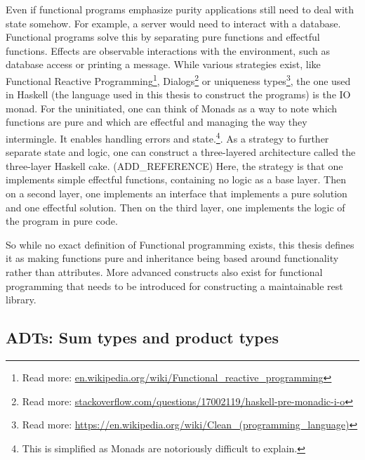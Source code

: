 \begin{description}
Even if functional programs emphasize purity applications still need to deal
        with state somehow. For example, a server would need to interact with a
        database. Functional programs solve this by separating pure functions
        and effectful functions. Effects are observable interactions with the
        environment, such as database access or printing a message.  While
        various strategies exist, like Functional Reactive
        Programming\footnote{Read more:
        \url{en.wikipedia.org/wiki/Functional_reactive_programming}},
        Dialogs\footnote{Read more:
        \url{stackoverflow.com/questions/17002119/haskell-pre-monadic-i-o}} or
        uniqueness types\footnote{Read more:
        \url{https://en.wikipedia.org/wiki/Clean_(programming_language)}}, the
        one used in Haskell (the language used in this thesis to construct the
        programs) is the IO monad. For the uninitiated, one can think of Monads
        as a way to note which functions are pure and which are effectful and
        managing the way they intermingle. It enables handling errors
        and state.\footnote{This is simplified as Monads are notoriously
        difficult to explain.}.  As a strategy to further separate state and logic, one can construct a
three-layered architecture called the three-layer Haskell cake.
(ADD\_REFERENCE) Here,
        the strategy is that one implements simple effectful functions,
        containing no logic as a base layer. Then on a second layer, one
        implements an interface that implements a pure solution and one
        effectful solution. Then on the third layer, one implements the logic of
        the program in pure code.  
\end{description}

So while no exact definition of Functional programming exists, this thesis
defines it as making functions pure and inheritance being based around
functionality rather than attributes. More advanced constructs also exist for
functional programming that needs to be introduced for constructing a
maintainable rest library. 

\subsection{ADTs: Sum types and product types}\label{types}

